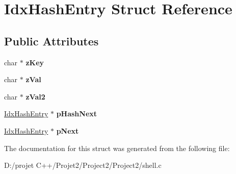 \hypertarget{struct_idx_hash_entry}{}\section{Idx\+Hash\+Entry Struct Reference}
\label{struct_idx_hash_entry}
\subsection*{Public Attributes}
\begin{DoxyCompactItemize}
\item 
\mbox{\label{struct_idx_hash_entry_a1d80691b4859298090838bb5ebe9efb4}} 
char $\ast$ {\bfseries z\+Key}
\item 
\mbox{\label{struct_idx_hash_entry_aff835ea7ed55ffee6691e6ea3628e9ed}} 
char $\ast$ {\bfseries z\+Val}
\item 
\mbox{\label{struct_idx_hash_entry_a5cd910b1e437c0eef317c0cafedf6d3b}} 
char $\ast$ {\bfseries z\+Val2}
\item 
\mbox{\label{struct_idx_hash_entry_a3d5c58c56b5175c1de14752d3d7dbab7}} 
\mbox{\hyperlink{struct_idx_hash_entry}{Idx\+Hash\+Entry}} $\ast$ {\bfseries p\+Hash\+Next}
\item 
\mbox{\label{struct_idx_hash_entry_a31cf0e2534154f723117a9c8d1c17dcf}} 
\mbox{\hyperlink{struct_idx_hash_entry}{Idx\+Hash\+Entry}} $\ast$ {\bfseries p\+Next}
\end{DoxyCompactItemize}


The documentation for this struct was generated from the following file\+:\begin{DoxyCompactItemize}
\item 
D\+:/projet C++/\+Projet2/\+Project2/\+Project2/shell.\+c\end{DoxyCompactItemize}
